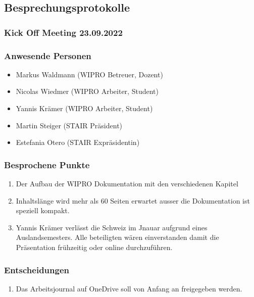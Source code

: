 \documentclass[a4paper, table]{article}
\begin{document}
\subsection{Besprechungsprotokolle}

\subsubsection{Kick Off Meeting 23.09.2022}

\subsubsection*{Anwesende Personen}

\begin{itemize}
    \item Markus Waldmann (WIPRO Betreuer, Dozent)
    \item Nicolas Wiedmer (WIPRO Arbeiter, Student)
    \item Yannis Krämer (WIPRO Arbeiter, Student)
    \item Martin Steiger (STAIR Präsident)
    \item Estefania Otero (STAIR Expräsidentin)
\end{itemize}

\subsubsection*{Besprochene Punkte}

\begin{enumerate}
    \item Der Aufbau der WIPRO Dokumentation mit den verschiedenen Kapitel
    \item Inhaltslänge wird mehr als 60 Seiten erwartet ausser die Dokumentation ist speziell kompakt.
    \item Yannis Krämer verlässt die Schweiz im Jnauar aufgrund eines Auslandsemesters. Alle beteiligten wären einverstanden damit die Präsentation frühzeitig oder online durchzuführen.
\end{enumerate}

\subsubsection*{Entscheidungen}

\begin{enumerate}
    \item Das Arbeitsjournal auf OneDrive soll von Anfang an freigegeben werden.
\end{enumerate}
\end{document}

